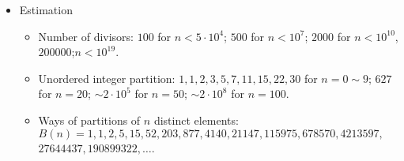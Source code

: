 \begin{itemize}
\item Estimation

\begin{itemize}
    \item Number of divisors: $100$ for $n < 5\cdot10^4$; $500$ for $n<10^7$; $2000$ for $n<10^{10}$, $200000$;$n<10^{19}$.
    \item Unordered integer partition: $1, 1, 2, 3, 5, 7, 11, 15, 22, 30$ for $n=0\sim 9$; $627$ for $n=20$; $\sim 2\cdot10^5$ for $n=50$; $\sim 2\cdot10^8$ for $n=100$.
    \item Ways of partitions of $n$ distinct elements: $B(n)=1, 1, 2, 5, 15, 52, 203, 877, 4140, 21147, 115975, 678570, 4213597,$\\
    $27644437, 190899322, \ldots$.
\end{itemize}

\end{itemize}
